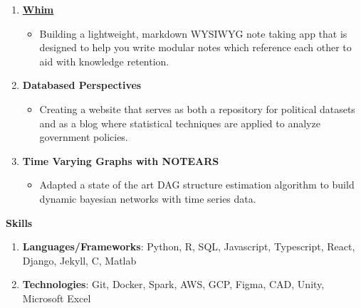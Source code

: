 \documentclass[letterpaper,11pt]{article}
\newlength{\outerbordwidth}
\newcommand{\resitem}[1]{\item #1 \vspace{-2pt}}
\newcommand{\resheading}[1]{\vspace{0pt} %
  \parbox{\textwidth}{\setlength{\FrameSep}{\outerbordwidth}
    \begin{shaded}
\setlength{\fboxsep}{0pt}\framebox[\textwidth][l]{\setlength{\fboxsep}{3.5pt}\fcolorbox{shadecolorB}{shadecolorB}{\textbf{\sffamily{\mbox{~}\makebox[7.262in][l]{\large #1} \vphantom{p\^{E}}}}}} %
    \end{shaded}
  }\vspace{-7pt} %
}
\begin{document}
\vspace{-5pt}
\begin{enumerate}[leftmargin=10pt]
\setlength\itemsep{1em}

\item[] \href{https://whim.so/}{\textbf{Whim}}\\
\vspace{-4pt}
\begin{itemize}
	\resitem{Building a lightweight, markdown WYSIWYG note taking app that is designed to help you write modular notes which reference each other to aid with knowledge retention.}
\end{itemize}

\vspace{-12pt}

\item[] \textbf{Databased Perspectives}\\
\vspace{-4pt}
\begin{itemize}
	\resitem{Creating a website that serves as both a repository for political datasets and as a blog where statistical techniques are applied to analyze government policies.}
\end{itemize}

\vspace{-12pt}

\item[] \textbf{Time Varying Graphs with NOTEARS}\\
\vspace{-4pt}
\begin{itemize}
	\resitem{Adapted a state of the art DAG structure estimation algorithm to build dynamic bayesian networks with time series data.}
\end{itemize}

\end{enumerate}

\vspace{-10pt}

\begin{mybox}
	\hspace{-8pt} \textbf{Skills}
\end{mybox}

\vspace{-5pt}
	\begin{enumerate}[leftmargin=10pt]
		\itemsep0em
		\item[] \textbf{Languages/Frameworks}: Python, R, SQL, Javascript, Typescript, React, Django, Jekyll, C, Matlab
		\item[] \textbf{Technologies}: Git, Docker, Spark, AWS, GCP, Figma, CAD, Unity, Microsoft Excel
		
	\end{enumerate}
\end{document}
